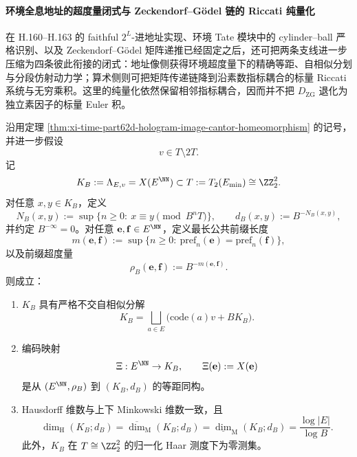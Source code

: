 \paragraph{环境全息地址的超度量闭式与 Zeckendorf--Gödel 链的 Riccati 纯量化}
在 H.160--H.163 的 faithful \(2^L\)-进地址实现、环境 Tate 模块中的 cylinder--ball 严格识别、以及 Zeckendorf--Gödel 矩阵递推已经固定之后，还可把两条支线进一步压缩为四条彼此衔接的闭式：地址像侧获得环境超度量下的精确等距、自相似分划与分段仿射动力学；算术侧则可把矩阵传递链降到沿素数指标耦合的标量 Riccati 系统与无穷乘积。这里的纯量化依然保留相邻指标耦合，因而并不把 \(D_{\mathrm{ZG}}\) 退化为独立素因子的标量 Euler 积。

\begin{theorem}\label{thm:xi-time-part62dcb-hologram-ambient-isometry-dimension}
沿用定理 \ref{thm:xi-time-part62d-hologram-image-cantor-homeomorphism} 的记号，并进一步假设
\[
v\in T\setminus 2T.
\]
记
\[
K_B:=\Lambda_{E,v}=X(E^{\NN})\subset T:=T_2(E_{\min})\cong \ZZ_2^2.
\]
对任意 \(x,y\in K_B\)，定义
\[
N_B(x,y):=\sup\{n\ge 0:\ x\equiv y\pmod{B^nT}\},
\qquad
d_B(x,y):=B^{-N_B(x,y)},
\]
并约定 \(B^{-\infty}=0\)。对任意 \(\mathbf e,\mathbf f\in E^{\NN}\)，定义最长公共前缀长度
\[
m(\mathbf e,\mathbf f):=\sup\{n\ge 0:\ \mathrm{pref}_n(\mathbf e)=\mathrm{pref}_n(\mathbf f)\},
\]
以及前缀超度量
\[
\rho_B(\mathbf e,\mathbf f):=B^{-m(\mathbf e,\mathbf f)}.
\]
则成立：
\begin{enumerate}
  \item \(K_B\) 具有严格不交自相似分解
  \[
  K_B=\bigsqcup_{a\in E}\bigl(\mathrm{code}(a)v+B K_B\bigr).
  \]
  \item 编码映射
  \[
  \Xi:E^{\NN}\to K_B,
  \qquad
  \Xi(\mathbf e):=X(\mathbf e)
  \]
  是从 \((E^{\NN},\rho_B)\) 到 \((K_B,d_B)\) 的等距同构。
  \item Hausdorff 维数与上下 Minkowski 维数一致，且
  \[
  \dim_{\mathrm H}(K_B;d_B)
  =
  \overline{\dim}_{\mathrm M}(K_B;d_B)
  =
  \underline{\dim}_{\mathrm M}(K_B;d_B)
  =
  \frac{\log |E|}{\log B}.
  \]
  此外，\(K_B\) 在 \(T\cong \ZZ_2^2\) 的归一化 Haar 测度下为零测集。
\end{enumerate}
\end{theorem}
